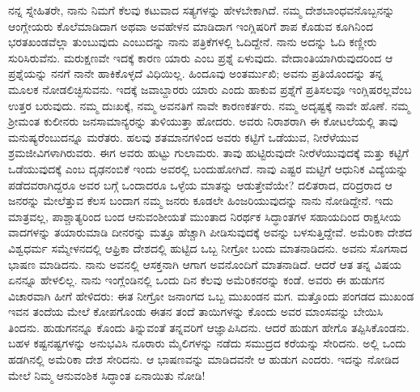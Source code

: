 ನನ್ನ ಸ್ನೇಹಿತರೇ, ನಾನು ನಿಮಗೆ ಕೆಲವು ಕಟುವಾದ ಸತ್ಯಗಳನ್ನು ಹೇಳಬೇಕಾಗಿದೆ. ನಮ್ಮ ದೇಶಬಾಂಧವನೊಬ್ಬನನ್ನು ಆಂಗ್ಲೇಯರು ಕೊಲೆಮಾಡಿದಾಗ ಅಥವಾ ಅವಹೇಳನ ಮಾಡಿದಾಗ ಇಂಗ್ಲಿಷರಿಗೆ ಶಾಪ ಕೊಡುವ ಕೂಗಿನಿಂದ ಭರತಖಂಡವೆಲ್ಲಾ ತುಂಬುವುದು ಎಂಬುದನ್ನು ನಾನು ಪತ್ರಿಕೆಗಳಲ್ಲಿ ಓದಿದ್ದೇನೆ. ನಾನು ಅದನ್ನು ಓದಿ ಕಣ್ಣೀರು ಸುರಿಸಿರುವೆನು. ಮರುಕ್ಷಣವೇ ಇದಕ್ಕೆ ಕಾರಣ ಯಾರು ಎಂಬ ಪ್ರಶ್ನೆ ಏಳುವುದು. ವೇದಾಂತಿಯಾಗಿರುವುದರಿಂದ ಆ ಪ್ರಶ್ನೆಯನ್ನು ನನಗೆ ನಾನೇ ಹಾಕಿಕೊಳ್ಳದೆ ವಿಧಿಯಿಲ್ಲ. ಹಿಂದೂವು ಅಂತರ್ಮುಖಿ; ಅವನು ಪ್ರತಿಯೊಂದನ್ನು ತನ್ನ ಮೂಲಕ ನೋಡಲಿಚ್ಛಿಸುವನು. ಇದಕ್ಕೆ ಜವಾಬ್ದಾರರು ಯಾರು ಎಂದು ಹಾಕುವ ಪ್ರಶ್ನೆಗೆ ಪ್ರತಿಸಲವೂ ಇಂಗ್ಲಿಷರಲ್ಲವೆಂಬ ಉತ್ತರ ಬರುವುದು. ನಮ್ಮ ದುಃಖಕ್ಕೆ, ನಮ್ಮ ಅವನತಿಗೆ ನಾವೇ ಕಾರಣಕರ್ತರು. ನಮ್ಮ ಅದೃಷ್ಟಕ್ಕೆ ನಾವೇ ಹೊಣೆ. ನಮ್ಮ ಶ‍್ರೀಮಂತ ಕುಲೀನರು ಜನಸಾಮಾನ್ಯರನ್ನು ತುಳಿಯುತ್ತಾ ಹೋದರು. ಅವರು ನಿರಾಶರಾಗಿ ಈ ಕೋಟಲೆಯಲ್ಲಿ ತಾವು ಮನುಷ್ಯರೆಂಬುದನ್ನೂ ಮರೆತರು. ಹಲವು ಶತಮಾನಗಳಿಂದ ಅವರು ಕಟ್ಟಿಗೆ ಒಡೆಯುವ, ನೀರೆಳೆಯುವ ಶ್ರಮಜೀವಿಗಳಾಗಿರುವರು. ಈಗ ಅವರು ಹುಟ್ಟು ಗುಲಾಮರು. ತಾವು ಹುಟ್ಟಿರುವುದೇ ನೀರೆಳೆಯುವುದಕ್ಕೆ ಮತ್ತು ಕಟ್ಟಿಗೆ ಒಡೆಯುವುದಕ್ಕೆ ಎಂಬ ದೃಢನಂಬಿಕೆ ಇಂದು ಅವರಲ್ಲಿ ಬಂದುಹೋಗಿದೆ. ನಾವು ಎಷ್ಟರ ಮಟ್ಟಿಗೆ ಆಧುನಿಕ ವಿದ್ಯೆಯನ್ನು ಪಡೆದವರಾಗಿದ್ದರೂ ಅವರ ಬಗ್ಗೆ ಒಂದಾದರೂ ಒಳ್ಳೆಯ ಮಾತನ್ನು ಆಡುತ್ತೇವೆಯೇ? ದಲಿತರಾದ, ದರಿದ್ರರಾದ ಆ ಜನರನ್ನು ಮೇಲೆತ್ತುವ ಕೆಲಸ ಬಂದಾಗ ನಮ್ಮ ಜನರು ಕೂಡಲೇ ಹಿಂಜರಿಯುವುದನ್ನು ನಾನು ನೋಡಿದ್ದೇನೆ. ಇದು ಮಾತ್ರವಲ್ಲ, ಪಾಶ್ಚಾತ್ಯರಿಂದ ಬಂದ ಆನುವಂಶೀಯತೆ ಮುಂತಾದ ನಿರರ್ಥಕ ಸಿದ್ಧಾಂತಗಳ ಸಹಾಯದಿಂದ ರಾಕ್ಷಸೀಯ ವಾದಗಳನ್ನು ತಯಾರುಮಾಡಿ ದೀನರನ್ನು ಮತ್ತೂ ಹೆಚ್ಚಾಗಿ ಪೀಡಿಸುವುದಕ್ಕೆ ಅವನ್ನು ಬಳಸುತ್ತಿದ್ದೇವೆ. ಅಮೆರಿಕಾ ದೇಶದ ವಿಶ್ವಧರ್ಮ ಸಮ್ಮೇಳನದಲ್ಲಿ ಆಫ್ರಿಕಾ ದೇಶದಲ್ಲಿ ಹುಟ್ಟಿದ ಒಬ್ಬ ನೀಗ್ರೋ ಬಂದು ಮಾತನಾಡಿದನು. ಅವನು ಸೊಗಸಾದ ಭಾಷಣ ಮಾಡಿದನು. ನಾನು ಅವನಲ್ಲಿ ಆಸಕ್ತನಾಗಿ ಆಗಾಗ ಅವನೊಂದಿಗೆ ಮಾತನಾಡಿದೆ. ಆದರೆ ಆತ ತನ್ನ ವಿಷಯ ಏನನ್ನೂ ಹೇಳಲಿಲ್ಲ. ನಾನು ಇಂಗ್ಲೆಂಡಿನಲ್ಲಿ ಒಂದು ದಿನ ಕೆಲವು ಅಮೆರಿಕನರನ್ನು ಕಂಡೆ. ಅವರು ಈ ಹುಡುಗನ ವಿಚಾರವಾಗಿ ಹೀಗೆ ಹೇಳಿದರು: ಈತ ನೀಗ್ರೋ ಜನಾಂಗದ ಒಬ್ಬ ಮುಖಂಡನ ಮಗ. ಮತ್ತೊಂದು ಪಂಗಡದ ಮುಖಂಡ ಇವನ ತಂದೆಯ ಮೇಲೆ ಕೋಪಗೊಂಡು ಈತನ ತಂದೆ ತಾಯಿಗಳನ್ನು ಕೊಂದು ಅವರ ಮಾಂಸವನ್ನು ಬೇಯಿಸಿ ತಿಂದನು. ಹುಡುಗನನ್ನೂ ಕೊಂದು ತಿನ್ನುವಂತೆ ತನ್ನವರಿಗೆ ಆಜ್ಞಾಪಿಸಿದನು. ಆದರೆ ಹುಡುಗ ಹೇಗೊ ತಪ್ಪಿಸಿಕೊಂಡನು. ಬಹಳ ಕಷ್ಟನಷ್ಟಗಳನ್ನು ಅನುಭವಿಸಿ ನೂರಾರು ಮೈಲಿಗಳನ್ನು ನಡೆದು ಸಮುದ್ರದ ಕರೆಯನ್ನು ಸೇರಿದನು. ಅಲ್ಲಿ ಒಂದು ಹಡಗಿನಲ್ಲಿ ಅಮೆರಿಕಾ ದೇಶ ಸೇರಿದನು. ಆ ಭಾಷಣವನ್ನು ಮಾಡಿದವನೇ ಆ ಹುಡುಗ ಎಂದರು. ಇದನ್ನು ನೋಡಿದ ಮೇಲೆ ನಿಮ್ಮ ಆನುವಂಶಿಕ ಸಿದ್ಧಾಂತ ಏನಾಯಿತು ನೋಡಿ!

